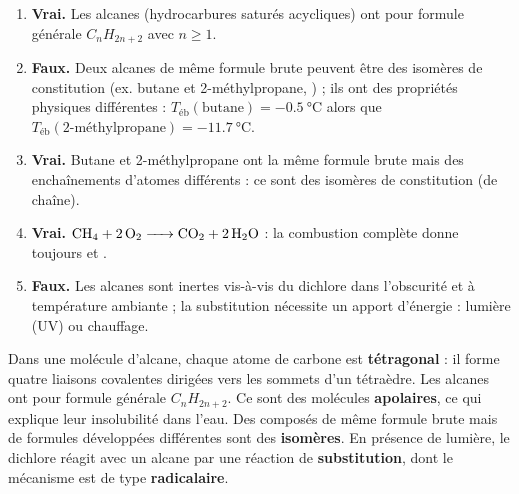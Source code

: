 \documentclass[11pt]{article}
\begin{document}
\begin{corrige}
\begin{enumerate}
\item \textbf{Vrai.} Les alcanes (hydrocarbures saturés acycliques) ont pour formule générale $C_nH_{2n+2}$ avec $n \ge 1$.
\item \textbf{Faux.} Deux alcanes de même formule brute peuvent être des isomères de constitution (ex. butane et 2-méthylpropane, ) ; ils ont des propriétés physiques différentes : $T_{\text{éb}}(\text{butane}) = \SI{-0,5}{\celsius}$ alors que $T_{\text{éb}}(\text{2-méthylpropane}) = \SI{-11,7}{\celsius}$.
\item \textbf{Vrai.} Butane  et 2-méthylpropane  ont la même formule brute  mais des enchaînements d'atomes différents : ce sont des isomères de constitution (de chaîne).
\item \textbf{Vrai.} $\ce{CH4 + 2 O2 -> CO2 + 2 H2O}$ : la combustion complète donne toujours  et .
\item \textbf{Faux.} Les alcanes sont inertes vis-à-vis du dichlore dans l'obscurité et à température ambiante ; la substitution nécessite un apport d'énergie : lumière (UV) ou chauffage.
\end{enumerate}
\end{corrige}

\begin{corrige}
Dans une molécule d'alcane, chaque atome de carbone est \textbf{tétragonal} : il forme quatre liaisons covalentes dirigées vers les sommets d'un tétraèdre. Les alcanes ont pour formule générale \textbf{$C_nH_{2n+2}$}. Ce sont des molécules \textbf{apolaires}, ce qui explique leur insolubilité dans l'eau. Des composés de même formule brute mais de formules développées différentes sont des \textbf{isomères}. En présence de lumière, le dichlore réagit avec un alcane par une réaction de \textbf{substitution}, dont le mécanisme est de type \textbf{radicalaire}.
\end{corrige}
\end{document}
